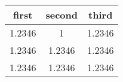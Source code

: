 \begin{table}
    \centering
    \begin{tabular}{ccc}
        first & second & third \\ \hline
        1.2346 & 1 & 1.2346 \\
        1.2346 & 1.2346 & 1.2346 \\
        1.2346 & 1.2346 & 1.2346 \\
    \end{tabular}
\end{table}
